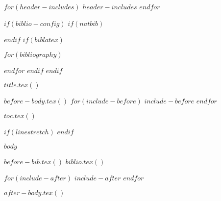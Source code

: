 $for(header-includes)$
$header-includes$
$endfor$

$if(biblio-config)$
$if(natbib)$
\usepackage[$natbiboptions$]{natbib}

$endif$
$if(biblatex)$
\usepackage[$if(biblio-style)$style=$biblio-style$,$endif$$for(biblatexoptions)$$biblatexoptions$$sep$,$endfor$]{biblatex}
$for(bibliography)$

$endfor$
$endif$
$endif$

\newenvironment{CSLReferences}[2]{ 
$if(natbib)$
$if(bibliography)$
$if(biblio-title)$
$if(has-chapters)$
\renewcommand\bibname{$biblio-title$}
$else$
\renewcommand\refname{$biblio-title$}
$endif$
$endif$

$endif$
$endif$
$if(biblatex)$
\printbibliography$if(biblio-title)$[title=$biblio-title$]$endif$
$endif$
\clearpage
}{}

\usepackage{hyperref}
\usepackage{url}

$title.tex()$




$before-body.tex()$
$for(include-before)$
$include-before$
$endfor$

$toc.tex()$

$if(linestretch)$
$endif$


$body$


$before-bib.tex()$
$biblio.tex()$

$for(include-after)$
$include-after$
$endfor$

$after-body.tex()$

